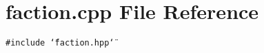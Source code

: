 \section{faction.cpp File Reference}
\label{faction_8cpp}
{\tt \#include \char`\"{}faction.hpp\char`\"{}}\par
